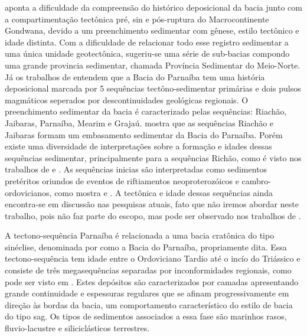 \cite{goes_formacao_1995} aponta a dificuldade da compreensão do histórico deposicional da bacia junto com a compartimentação tectônica pré, sin e pós-ruptura do Macrocontinente Gondwana, devido a um preenchimento sedimentar com gênese, estilo tectônico e idade distinta. Com a dificuldade de relacionar todo esse registro sedimentar a uma única unidade geotectônica, sugeriu-se uma série de sub-bacias compondo uma grande provincia sedimentar, chamada Província Sedimentar do Meio-Norte. Já os trabalhos de \cite{vaz_bacia_2007,daly_brasiliano_2014,de_castro_geophysical_2016,tozer_crustal_2017} entendem que a Bacia do Parnaíba tem uma história deposicional marcada por 5 sequências tectôno-sedimentar primárias e dois pulsos magmáticos seperados por descontinuidades geológicas regionais. O preenchimento sedimentar da bacia é caracterizado pelas sequências: Riachão, Jaibaras, Parnaíba, Mearim e Grajaú. \cite{vaz_bacia_2007} mostra que as sequências Riachão e Jaibaras formam um embasamento sedimentar da Bacia do Parnaíba. Porém existe uma diversidade de interpretações sobre a formação e idades dessas sequências sedimentar, principalmente para a sequências Richão, como é visto nos trabalhos de \cite{de_castro_geophysical_2016} e \cite{tozer_crustal_2017}. As sequências inicias são interpretadas como sedimentos pretéritos oriundos de eventos de riftiamentos neoproterozóicos e cambro-ordovicianos, como mostra \cite{de_oliveira_jaibaras_2003} e \cite{de_castro_crustal_2014}. A tectônica e idade dessas sequências ainda encontra-se em discussão nas pesquisas atuais, fato que não iremos abordar neste trabalho, pois não faz parte do escopo, mas pode ser observado nos trabalhos de \cite{de_castro_crustal_2014,daly_brasiliano_2014,de_castro_geophysical_2016,tozer_crustal_2017}.

A tectono-sequência Parnaíba é relacionada a uma bacia cratônica do tipo sinéclise, denominada por \cite{goes_formacao_1995} como a Bacia do Parnaíba, propriamente dita. Essa tectono-sequência tem idade entre o Ordoviciano Tardio até o incío do Triássico e consiste de três megasequências separadas por inconformidades regionais, como pode ser visto em \cite{daly_brasiliano_2014}. Estes depósitos são caracterizados por camadas apresentando grande continuidade e espessuras regulares que se afinam progressivamente em direção às bordas da bacia, um comportamento característico do estilo de bacia do tipo sag. Os tipos de sedimentos associados a essa fase são marinhos rasos, fluvio-lacustre e siliciclásticos terrestres. 


